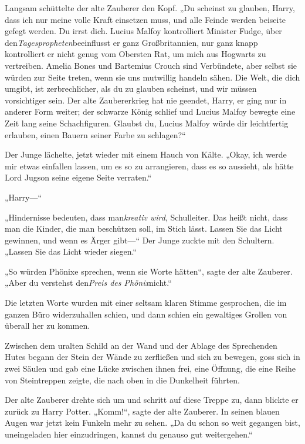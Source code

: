 {Langsam schüttelte der alte Zauberer den Kopf. „Du scheinst zu glauben, Harry, dass ich nur meine volle Kraft einsetzen muss, und alle Feinde werden beiseite gefegt werden. Du irrst dich. Lucius Malfoy kontrolliert Minister Fudge, über den\emph{Tagespropheten}beeinflusst er ganz Großbritannien, nur ganz knapp kontrolliert er nicht genug vom Obersten Rat, um mich aus Hogwarts zu vertreiben. Amelia Bones und Bartemius Crouch sind Verbündete, aber selbst sie würden zur Seite treten, wenn sie uns mutwillig handeln sähen. Die Welt, die dich umgibt, ist zerbrechlicher, als du zu glauben scheinst, und wir müssen vorsichtiger sein. Der alte Zaubererkrieg hat nie geendet, Harry, er ging nur in anderer Form weiter; der schwarze König schlief und Lucius Malfoy bewegte eine Zeit lang seine Schachfiguren. Glaubst du, Lucius Malfoy würde dir leichtfertig erlauben, einen Bauern seiner Farbe zu schlagen?“

Der Junge lächelte, jetzt wieder mit einem Hauch von Kälte. „Okay, ich werde mir etwas einfallen lassen, um es so zu arrangieren, dass es so aussieht, als hätte Lord Jugson seine eigene Seite verraten.“

„Harry—“

„Hindernisse bedeuten, dass man\emph{kreativ wird}, Schulleiter. Das heißt nicht, dass man die Kinder, die man beschützen soll, im Stich lässt. Lassen Sie das Licht gewinnen, und wenn es Ärger gibt—“ Der Junge zuckte mit den Schultern. „Lassen Sie das Licht wieder siegen.“

„So würden Phönixe sprechen, wenn sie Worte hätten“, sagte der alte Zauberer. „Aber du verstehst den\emph{Preis des Phönix}nicht.“

Die letzten Worte wurden mit einer seltsam klaren Stimme gesprochen, die im ganzen Büro widerzuhallen schien, und dann schien ein gewaltiges Grollen von überall her zu kommen.

Zwischen dem uralten Schild an der Wand und der Ablage des Sprechenden Hutes begann der Stein der Wände zu zerfließen und sich zu bewegen, goss sich in zwei Säulen und gab eine Lücke zwischen ihnen frei, eine Öffnung, die eine Reihe von Steintreppen zeigte, die nach oben in die Dunkelheit führten.

Der alte Zauberer drehte sich um und schritt auf diese Treppe zu, dann blickte er zurück zu Harry Potter. „Komm!“, sagte der alte Zauberer. In seinen blauen Augen war jetzt kein Funkeln mehr zu sehen. „Da du schon so weit gegangen bist, uneingeladen hier einzudringen, kannst du genauso gut weitergehen.“

}
